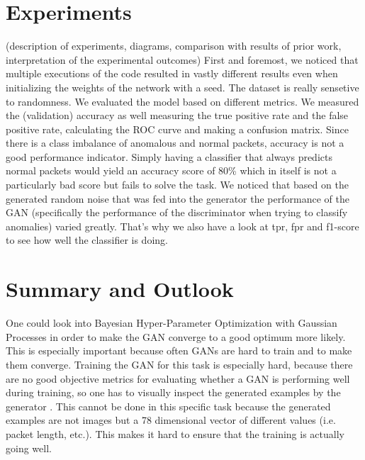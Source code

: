 \documentclass[]{article}
\begin{document}
	\section{Experiments}
	(description of experiments, diagrams, comparison with results of prior work, interpretation of the experimental outcomes)
	First and foremost, we noticed that multiple executions of the code resulted in vastly different results even when initializing the weights of the network with a seed. The dataset is really sensetive to randomness.  
	We evaluated the model based on different metrics. We measured the (validation) accuracy as well measuring the true positive rate and the false positive rate, calculating the ROC curve and making a confusion matrix. Since there is a class imbalance of anomalous and normal packets, accuracy is not a good performance indicator. Simply having a classifier that always predicts normal packets would yield an accuracy score of 80\% which in itself is not a particularly bad score but fails to solve the task. We noticed that based on the generated random noise that was fed into the generator the performance of the GAN (specifically the performance of the discriminator when trying to classify anomalies) varied greatly. That's why we also have a look at tpr, fpr and f1-score to see how well the classifier is doing. 
	\section{Summary and Outlook}
	
	One could look into Bayesian Hyper-Parameter Optimization with Gaussian Processes in order to make the GAN converge to a good optimum more likely. This is especially important because often GANs are hard to train and to make them converge. Training the GAN for this task is especially hard, because there are no good objective metrics for evaluating whether a GAN is performing well during training, so one has to visually inspect the generated examples by the generator \cite{https://doi.org/10.48550/arxiv.1606.03498}. This cannot be done in this specific task because the generated examples are not images but a 78 dimensional vector of different values (i.e. packet length, etc.). This makes it hard to ensure that the training is actually going well. 
	\newpage
	
	
\end{document}
